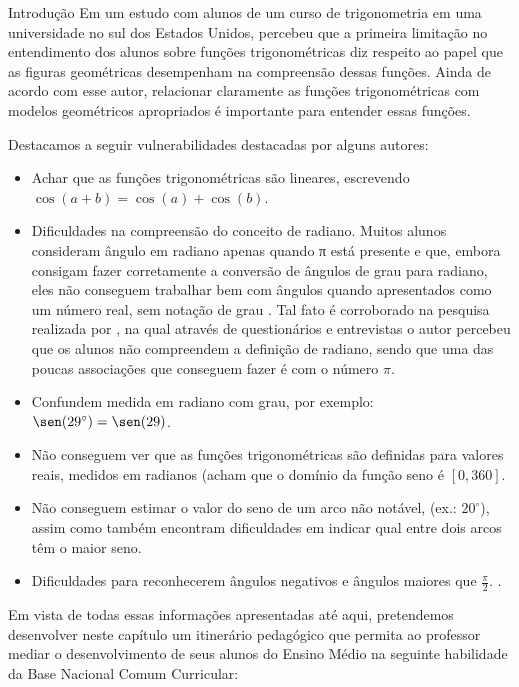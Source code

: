 \begin{apresentacao}{Introdução}
Em um estudo com alunos de um curso de trigonometria em uma universidade no sul dos Estados Unidos, \cite{weber2005} percebeu que a primeira limitação no entendimento dos alunos sobre funções trigonométricas diz respeito ao papel que as figuras geométricas desempenham na compreensão dessas funções. Ainda de acordo com esse autor, relacionar claramente as funções trigonométricas com modelos geométricos apropriados é importante para entender essas funções.


Destacamos a seguir vulnerabilidades destacadas por alguns autores:

\begin{itemize}
\item Achar que as funções trigonométricas são lineares, escrevendo $\cos(a+b) = \cos(a)+\cos(b)$. \citep{siyepu2015}
\item Dificuldades na compreensão do conceito de radiano. Muitos alunos consideram ângulo em radiano apenas quando π está presente e que, embora consigam fazer corretamente a conversão de ângulos de grau para radiano, eles não conseguem trabalhar bem com ângulos quando apresentados como um número real, sem notação de grau \citep{orhun2010}. Tal fato é corroborado na pesquisa realizada por \cite{feijo2017}, na qual através de questionários e entrevistas o autor percebeu que os alunos não compreendem a definição de radiano, sendo que uma das poucas associações que conseguem fazer é com o número  $\pi$.
\item Confundem medida em radiano com grau, por exemplo: $\sen(29^{\circ}) = \sen(29)$. \citep{orhun2010}
\item Não conseguem ver que as funções trigonométricas são definidas para valores reais, medidos em radianos (acham que o domínio da função seno é $[0,360]$. \citep{orhun2010}
\item Não conseguem estimar o valor do seno de um arco não notável, (ex.: $20^{\circ}$), assim como também encontram dificuldades em indicar qual entre dois arcos têm o maior seno. \citep{weber2005}
\item Dificuldades para reconhecerem ângulos negativos e ângulos maiores que $\frac{\pi}{2}$. \citep{feijo2017}.
\end{itemize}

Em vista de todas essas informações apresentadas até aqui, pretendemos desenvolver neste capítulo um itinerário pedagógico que permita ao professor mediar o desenvolvimento de seus alunos do Ensino Médio na seguinte habilidade da Base Nacional Comum Curricular:



\end{apresentacao}

